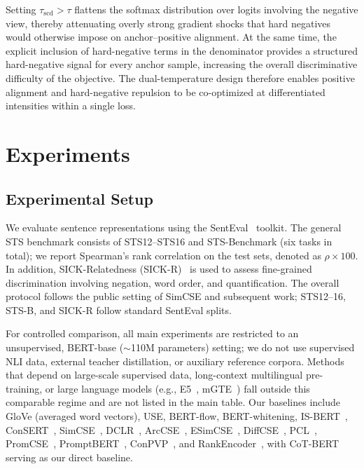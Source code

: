 \documentclass[a4paper,fleqn]{cas-dc}
\begin{document}
Setting $\tau_{\mathrm{scd}} > \tau$ flattens the softmax distribution over logits involving the negative view, thereby attenuating overly strong gradient shocks that hard negatives would otherwise impose on anchor--positive alignment. At the same time, the explicit inclusion of hard-negative terms in the denominator provides a structured hard-negative signal for every anchor sample, increasing the overall discriminative difficulty of the objective. The dual-temperature design therefore enables positive alignment and hard-negative repulsion to be co-optimized at differentiated intensities within a single loss.

\section{Experiments}
\label{sec:exp}

\subsection{Experimental Setup}
\label{subsec:setup-exp}

We evaluate sentence representations using the SentEval~\cite{senteval} toolkit. The general STS benchmark consists of STS12--STS16 and STS-Benchmark (six tasks in total); we report Spearman's rank correlation on the test sets, denoted as $\rho \times 100$. In addition, SICK-Relatedness (SICK-R)~\cite{sick} is used to assess fine-grained discrimination involving negation, word order, and quantification. The overall protocol follows the public setting of SimCSE and subsequent work; STS12--16, STS-B, and SICK-R follow standard SentEval splits.

For controlled comparison, all main experiments are restricted to an unsupervised, BERT-base ($\sim$110M parameters) setting; we do not use supervised NLI data, external teacher distillation, or auxiliary reference corpora. Methods that depend on large-scale supervised data, long-context multilingual pre-training, or large language models (e.g., E5~\cite{e5}, mGTE~\cite{gte}) fall outside this comparable regime and are not listed in the main table. Our baselines include GloVe (averaged word vectors), USE, BERT-flow, BERT-whitening, IS-BERT~\cite{isbert}, ConSERT~\cite{consert}, SimCSE~\cite{simcse}, DCLR~\cite{dclr}, ArcCSE~\cite{arccse}, ESimCSE~\cite{esimcse}, DiffCSE~\cite{diffcse}, PCL~\cite{pcl}, PromCSE~\cite{promcse}, PromptBERT~\cite{promptbert}, ConPVP~\cite{conpvp}, and RankEncoder~\cite{rankencoder}, with CoT-BERT~\cite{cotbert} serving as our direct baseline.
\end{document}
